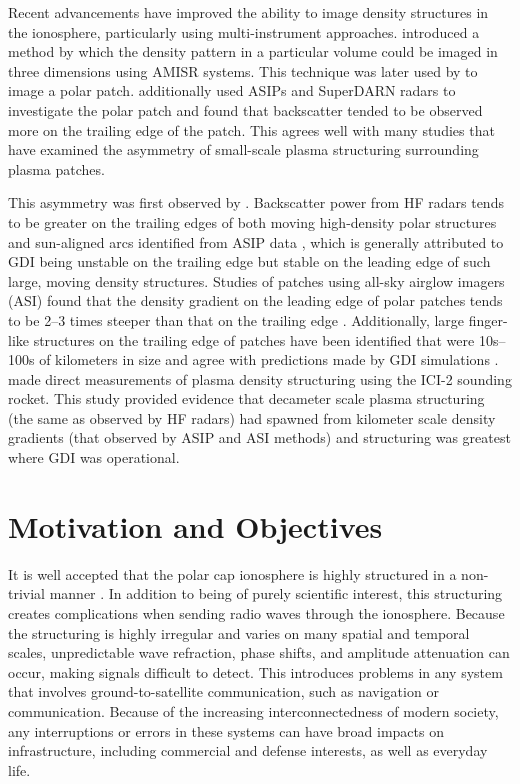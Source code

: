 Recent advancements have improved the ability to image density structures in the ionosphere, particularly using multi-instrument approaches.  \citet{Semeter2009} introduced a method by which the density pattern in a particular volume could be imaged in three dimensions using AMISR systems.  This technique was later used by \citet{Dahlgren2012a,Dahlgren2012b} to image a polar patch.  \citet{Dahlgren2012b} additionally used ASIPs and SuperDARN radars to investigate the polar patch and found that backscatter tended to be observed more on the trailing edge of the patch.  This agrees well with many studies that have examined the asymmetry of small-scale plasma structuring surrounding plasma patches.  

This asymmetry was first observed by \citet{Weber1984}.  Backscatter power from HF radars tends to be greater on the trailing edges of both moving high-density polar structures \citep{Milan2002b} and sun-aligned arcs identified from ASIP data \citep{Koustov2012}, which is generally attributed to GDI being unstable on the trailing edge but stable on the leading edge of such large, moving density structures.  Studies of patches using all-sky airglow imagers (ASI) found that the density gradient on the leading edge of polar patches tends to be 2--3 times steeper than that on the trailing edge \citep{Hosokawa2016}.  Additionally, large finger-like structures on the trailing edge of patches have been identified that were 10s--100s of kilometers in size and agree with predictions made by GDI simulations \citep{Gondarenko2004b}.  \citet{Moen2012} made direct measurements of plasma density structuring using the ICI-2 sounding rocket.  This study provided evidence that decameter scale plasma structuring (the same as observed by HF radars) had spawned from kilometer scale density gradients (that observed by ASIP and ASI methods) and structuring was greatest where GDI was operational.

\section{Motivation and Objectives}

It is well accepted that the polar cap ionosphere is highly structured in a non-trivial manner \citep{Carlson2012}.  In addition to being of purely scientific interest, this structuring creates complications when sending radio waves through the ionosphere.  Because the structuring is highly irregular and varies on many spatial and temporal scales, unpredictable wave refraction, phase shifts, and amplitude attenuation can occur, making signals difficult to detect.  This introduces problems in any system that involves ground-to-satellite communication, such as navigation or communication.  Because of the increasing interconnectedness of modern society, any interruptions or errors in these systems can have broad impacts on infrastructure, including commercial and defense interests, as well as everyday life.

